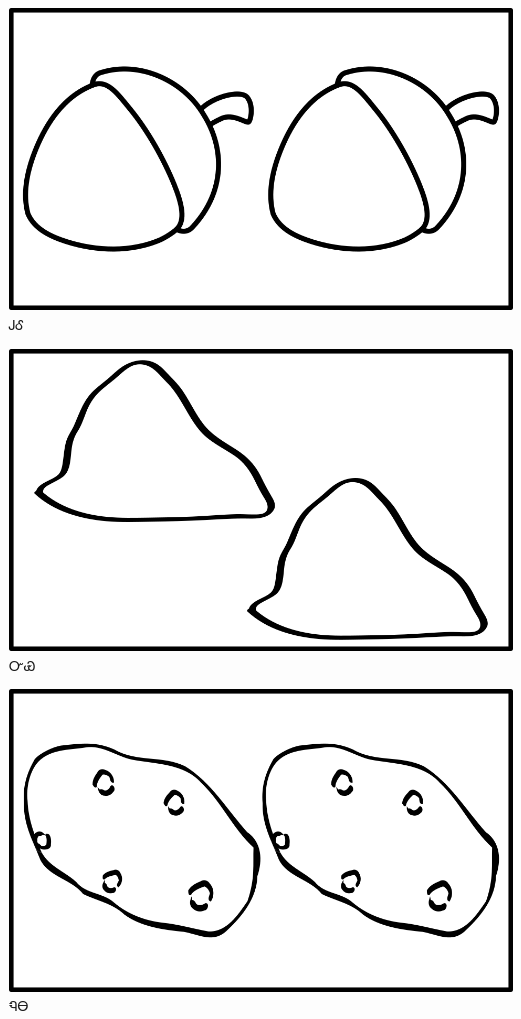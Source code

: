 \documentclass[avery5371]{flashcards}%
\begin{document}
\begin{flashcard}{
\includegraphics[width=0.95\columnwidth,height=.51\columnwidth,keepaspectratio]{../artwork/objects-neutral/tali-gule}
}\Huge ᎫᎴ
\end{flashcard}

\begin{flashcard}{
\includegraphics[width=0.95\columnwidth,height=.51\columnwidth,keepaspectratio]{../artwork/objects-neutral/tali-nvya}
}\Huge ᏅᏯ
\end{flashcard}

\begin{flashcard}{
\includegraphics[width=0.95\columnwidth,height=.51\columnwidth,keepaspectratio]{../artwork/objects-neutral/tali-nuna}
}\Huge ᏄᎾ
\end{flashcard}
\end{document}
